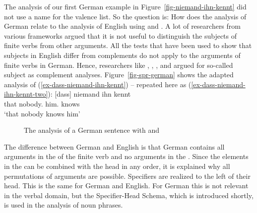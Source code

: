The analysis of our first German example in Figure~\ref{fig-niemand-ihn-kennt} did not use a name
for the valence list. So the question is: How does the analysis of German relate to the analysis of
English using \spr and \comps. A lot of researchers from various frameworks argued that it is not
useful to distinguish the subjects of finite verbs from other arguments. All the tests that have
been used to show that subjects in English differ from complements do not apply to the arguments of
finite verbs in German. Hence, researchers like \citet{Pollard90a}, \citet{Haider93a}, 
\citet[]{Eisenberg94b}, and \citet{Kiss95a} argued for so-called subject as complement
analyses. Figure~\vref{fig-spr-german} shows the adapted analysis of
(\ref{ex-dass-niemand-ihn-kennt}) -- repeated here as
(\ref{ex-dass-niemand-ihn-kennt-two}):
\ea
\label{ex-dass-niemand-ihn-kennt-two}
\gll  {}[dass] niemand ihn kennt\\
      \spacebr{}that nobody.\NOM{} him.\ACC{} knows\\ 
\glt `that nobody knows him'
\z
\begin{figure}
\caption{\label{fig-spr-german}The analysis of a German sentence with \spr and \compsl}
\end{figure}
The difference between German and English is that German contains all arguments in the \compsl of
the finite verb and no arguments in the \sprl. Since the elements in the \compsl can be combined
with the head in any order, it is explained why all permutations of arguments are
possible. Specifiers are realized to the left of their head. This is the same for German and
English. For German this is not relevant in the verbal domain, but the Specifier-Head Schema, which
is introduced shortly, is used in the analysis of noun phrases.

